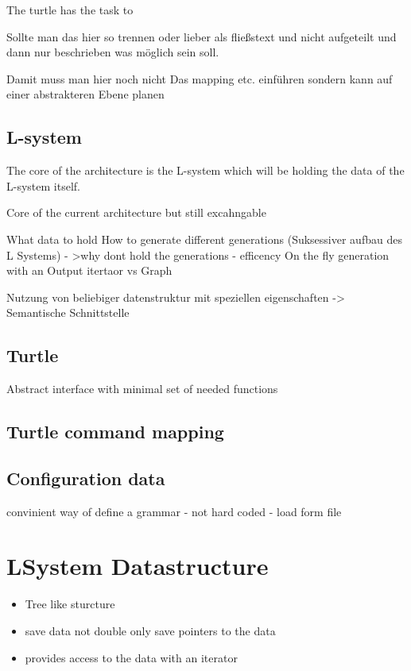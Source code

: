 \documentclass[english]{cpp-hmwk}
\begin{document}
\medskip

\noindent The turtle has the task to 

Sollte man das hier so trennen oder lieber als fließstext und nicht aufgeteilt und dann nur beschrieben was möglich sein soll.

Damit muss man hier noch nicht Das mapping etc. einführen sondern kann auf einer abstrakteren Ebene planen


\subsection{L-system}
The core of the architecture is the L-system which will be holding the data of the L-system itself. 

\bigskip

Core of the current architecture but still excahngable

What data to hold 
How to generate different generations (Suksessiver aufbau des L Systems)
 - >why dont hold the generations - efficency
On the fly generation with an Output itertaor vs Graph

 Nutzung von beliebiger datenstruktur mit speziellen eigenschaften -> Semantische Schnittstelle

\subsection{Turtle}
Abstract interface with minimal set of needed functions

\subsection{Turtle command mapping}

\subsection{Configuration data}
convinient way of define a grammar - not hard coded - load form file


\section{LSystem Datastructure}

\begin{itemize}
	\item Tree like sturcture
	\item save data not double only save pointers to the data
	\item provides access to the data with an iterator
\end{itemize}
\end{document}
